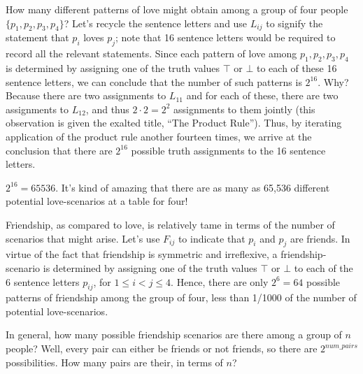 How many different patterns of love might obtain among a group of four people $\{p_1,p_2,p_3,p_4\}$? Let's recycle the sentence letters and use $L_{ij}$ to signify the statement that $p_i$ loves $p_j$; note that 16 sentence letters would be required to record all the relevant statements. Since each pattern of love among $p_1,p_2,p_3,p_4$ is determined by assigning one of the truth values $\top$ or $\bot$ to each of these 16 sentence letters, we can conclude that the number of such patterns is $2^{16}$. Why? Because there are two assignments to $L_{11}$ and for each of these, there are two assignments to $L_{12}$, and thus $2\cdot 2 = 2^2$ assignments to them jointly (this observation is given the exalted title, ``The Product Rule''). Thus, by iterating application of the product rule another fourteen times, we arrive at the conclusion that there are $2^{16}$ possible truth assignments to the 16 sentence letters. 

\begin{aside}
    $2^{16} = 65536$. It's kind of amazing that there are as many as 65,536 different potential love-scenarios at a table for four!
\end{aside}

Friendship, as compared to love, is relatively tame in terms of the number of scenarios that might arise. Let's use $F_{ij}$ to indicate that $p_i$ and $p_j$ are friends. In virtue of the fact that friendship is symmetric and irreflexive, a friendship-scenario is determined by assigning one of the truth values $\top$ or $\bot$ to each of the 6 sentence letters $p_{ij}$, for $1\leq i < j\leq 4$. Hence, there are only $2^6=64$ possible patterns of friendship among the group of four, less than 1/1000 of the number of potential love-scenarios. 

\begin{aside}
In general, how many possible friendship scenarios are there among a group of $n$ people? Well, every pair can either be friends or not friends, so there are $2^{num\_pairs}$ possibilities. How many pairs are their, in terms of $n$? 
\end{aside}

\newpage

